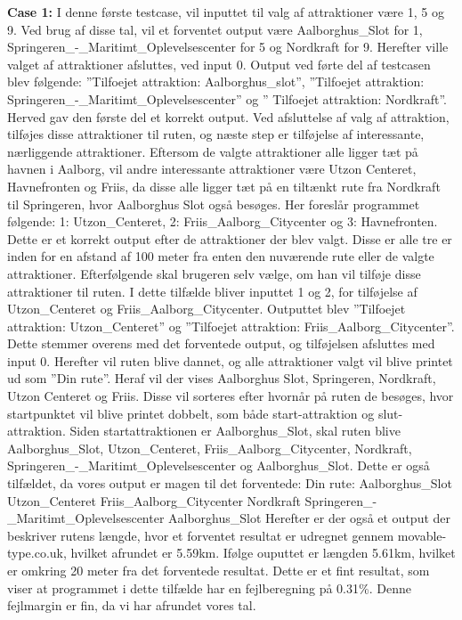 \textbf{Case 1:} \newline
I denne første testcase, vil inputtet til valg af attraktioner være 1, 5 og 9. Ved brug af disse tal, vil et forventet output være Aalborghus\_Slot for 1, Springeren\_-\_Maritimt\_Oplevelsescenter for 5 og Nordkraft for 9. Herefter ville valget af attraktioner afsluttes, ved input 0.
Output ved førte del af testcasen blev følgende: ”Tilfoejet attraktion: Aalborghus\_slot”, ”Tilfoejet attraktion: Springeren\_-\_Maritimt\_Oplevelsescenter” og ” Tilfoejet attraktion: Nordkraft”. Herved gav den første del et korrekt output. Ved afsluttelse af valg af attraktion, tilføjes disse attraktioner til ruten, og næste step er tilføjelse af interessante, nærliggende attraktioner. Eftersom de valgte attraktioner alle ligger tæt på havnen i Aalborg, vil andre interessante attraktioner være Utzon Centeret, Havnefronten og Friis, da disse alle ligger tæt på en tiltænkt rute fra Nordkraft til Springeren, hvor Aalborghus Slot også besøges.\newline
Her foreslår programmet følgende: 1: Utzon\_Centeret, 2: Friis\_Aalborg\_Citycenter og 3: Havnefronten. Dette er et korrekt output efter de attraktioner der blev valgt. Disse er alle tre er inden for en afstand af 100 meter fra enten den nuværende rute eller de valgte attraktioner. Efterfølgende skal brugeren selv vælge, om han vil tilføje disse attraktioner til ruten. I dette tilfælde bliver inputtet 1 og 2, for tilføjelse af Utzon\_Centeret og Friis\_Aalborg\_Citycenter. Outputtet blev ”Tilfoejet attraktion: Utzon\_Centeret” og ”Tilfoejet attraktion: Friis\_Aalborg\_Citycenter”. Dette stemmer overens med det forventede output, og tilføjelsen afsluttes med input 0. Herefter vil ruten blive dannet, og alle attraktioner valgt vil blive printet ud som ”Din rute”. Heraf vil der vises Aalborghus Slot, Springeren, Nordkraft, Utzon Centeret og Friis. Disse vil sorteres efter hvornår på ruten de besøges, hvor startpunktet vil blive printet dobbelt, som både start-attraktion og slut-attraktion. Siden startattraktionen er Aalborghus\_Slot, skal ruten blive Aalborghus\_Slot, Utzon\_Centeret, Friis\_Aalborg\_Citycenter, Nordkraft, Springeren\_-\_Maritimt\_Oplevelsescenter og Aalborghus\_Slot. Dette er også tilfældet, da vores output er magen til det forventede:\newline
Din rute:\newline
Aalborghus\_Slot\newline
Utzon\_Centeret\newline
Friis\_Aalborg\_Citycenter\newline
Nordkraft\newline
Springeren\_-\_Maritimt\_Oplevelsescenter\newline
Aalborghus\_Slot\newline
Herefter er der også et output der beskriver rutens længde, hvor et forventet resultat er udregnet gennem movable-type.co.uk, hvilket afrundet er 5.59km. Ifølge ouputtet er længden 5.61km, hvilket er omkring 20 meter fra det forventede resultat. Dette er et fint resultat, som viser at programmet i dette tilfælde har en fejlberegning på 0.31\%. Denne fejlmargin er fin, da vi har afrundet vores tal.

